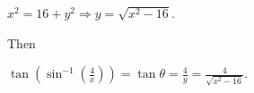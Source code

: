 \documentclass[nooutcomes]{ximera}
\begin{document}
\begin{problem}
\begin{enumerate}
\begin{freeResponse}
			$x^2 = 16 + y^2 \Longrightarrow y = \sqrt{x^2 - 16}$.
			
			Then
			
			$ \tan \left( \sin^{-1} \left( \frac{4}{x} \right) \right) = \tan \theta = \frac{4}{y} = \frac{4}{\sqrt{x^2 - 16}}  $.
			 \end{freeResponse}
			
			\end{enumerate}
			
\end{problem}
			
			
			

	










								
				
				
	
\end{document}
